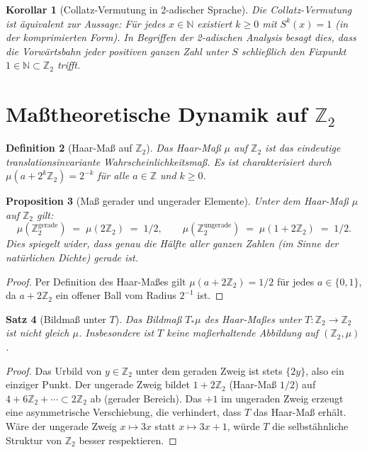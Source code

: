 \documentclass[12pt,a4paper]{article}
\newtheorem{theorem}{Satz}[section]
\newtheorem{proposition}[theorem]{Proposition}
\newtheorem{corollary}[theorem]{Korollar}
\newtheorem{definition}[theorem]{Definition}
\begin{document}
\begin{corollary}[Collatz-Vermutung in 2-adischer Sprache]\label{cor:reformulierung}
Die Collatz-Vermutung ist äquivalent zur Aussage: Für jedes $x \in \mathbb{N}$ existiert
$k \geq 0$ mit $S^k(x) = 1$ (in der komprimierten Form). In Begriffen der 2-adischen
Analysis besagt dies, dass die Vorwärtsbahn jeder positiven ganzen Zahl unter $S$
schließlich den Fixpunkt $1 \in \mathbb{N} \subset \mathbb{Z}_2$ trifft.
\end{corollary}

\section{Maßtheoretische Dynamik auf $\mathbb{Z}_2$}\label{sec:dynamik}

\begin{definition}[Haar-Maß auf $\mathbb{Z}_2$]\label{def:haar}
Das \emph{Haar-Maß} $\mu$ auf $\mathbb{Z}_2$ ist das eindeutige translationsinvariante
Wahrscheinlichkeitsmaß. Es ist charakterisiert durch $\mu(a + 2^k \mathbb{Z}_2) = 2^{-k}$
für alle $a \in \mathbb{Z}$ und $k \geq 0$.
\end{definition}

\begin{proposition}[Maß gerader und ungerader Elemente]\label{prop:parit_mass}
Unter dem Haar-Maß $\mu$ auf $\mathbb{Z}_2$ gilt:
\[
  \mu(\mathbb{Z}_2^{\text{gerade}}) \;=\; \mu(2\mathbb{Z}_2) \;=\; 1/2,
\qquad
  \mu(\mathbb{Z}_2^{\text{ungerade}}) \;=\; \mu(1 + 2\mathbb{Z}_2) \;=\; 1/2.
\]
Dies spiegelt wider, dass genau die Hälfte aller ganzen Zahlen (im Sinne der natürlichen
Dichte) gerade ist.
\end{proposition}

\begin{proof}
Per Definition des Haar-Maßes gilt $\mu(a + 2\mathbb{Z}_2) = 1/2$ für jedes $a \in \{0,1\}$,
da $a + 2\mathbb{Z}_2$ ein offener Ball vom Radius $2^{-1}$ ist.
\end{proof}

\begin{theorem}[Bildmaß unter $T$]\label{thm:bildmass}
Das Bildmaß $T_* \mu$ des Haar-Maßes unter $T\colon \mathbb{Z}_2 \to \mathbb{Z}_2$
ist nicht gleich $\mu$. Insbesondere ist $T$ keine maßerhaltende Abbildung auf
$(\mathbb{Z}_2, \mu)$.
\end{theorem}

\begin{proof}
Das Urbild von $y \in \mathbb{Z}_2$ unter dem geraden Zweig ist stets $\{2y\}$, also
ein einziger Punkt. Der ungerade Zweig bildet $1 + 2\mathbb{Z}_2$ (Haar-Maß $1/2$)
auf $4 + 6\mathbb{Z}_2 + \cdots \subset 2\mathbb{Z}_2$ ab (gerader Bereich). Das $+1$
im ungeraden Zweig erzeugt eine asymmetrische Verschiebung, die verhindert, dass $T$
das Haar-Maß erhält. Wäre der ungerade Zweig $x \mapsto 3x$ statt $x \mapsto 3x+1$,
würde $T$ die selbstähnliche Struktur von $\mathbb{Z}_2$ besser respektieren.
\end{proof}
\end{document}
